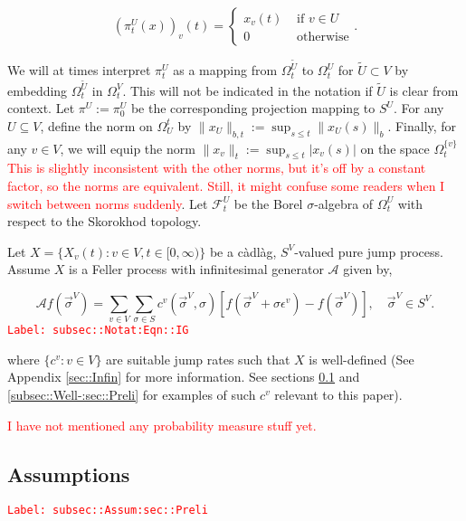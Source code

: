 \documentclass[12pt]{article}
\newcommand{\mc}{\mathcal}
\newcommand{\te}{\text}
\newcommand{\ep}{\epsilon}
\newcommand{\tr}{\textcolor{red}}
\newcommand{\labe}[1]{\tr{\texttt{Label: #1}}}
\newcommand{\ind}{\hspace{24pt}}
\newcommand{\defeq}{:=}								%
\renewcommand{\v}{v}							%
\renewcommand{\U}{U}							%
\renewcommand{\S}{S}							%
\newcommand{\s}{\sigma}							%
\newcommand{\sv}{\vec{\s}}						%
\renewcommand{\b}{b}							%
\newcommand{\ev}{\ep}							%
\newcommand{\x}{x}								%
\renewcommand{\t}{t}							%
\newcommand{\sset}{\Omega}						%
\newcommand{\proj}{\pi}							%
\renewcommand{\tt}{s}							%
\newcommand{\F}{\mc{F}}							%
\newcommand{\X}{X}								%
\newcommand{\IG}{\mc{A}}						%
\newcommand{\IGr}{c}							%
\newcommand{\vind}[1]{^{#1}}					%
\newcommand{\carp}[1]{^{#1}}					%
\newcommand{\vsi}[1]{^{#1}}						%
\newcommand{\cind}[1]{_{#1}}					%
\newcommand{\tp}[1]{(#1)}						%
\newcommand{\ts}[1]{_{#1}}						%
\newcommand{\alt}[1]{\widetilde{#1}}			%
\begin{document}
\[\left(\proj\vsi{\U}\ts{\t}(\x)\right)\cind{\v}\tp{\t} = \begin{cases}
\x\cind{\v}\tp{\t} &\te{ if } \v \in \U\\
0 &\te{ otherwise}
\end{cases}.\]

We will at times interpret \(\proj\vsi{\U}\ts{\t}\) as a mapping from \(\sset\vsi{\alt{\U}}\ts{\t}\) to \(\sset\vsi{\U}\ts{\t}\) for \(\alt{\U}\subset V\) by embedding \(\sset\vsi{\alt{U}}\ts{\t}\) in \(\sset\vsi{V}\ts{\t}\). This will not be indicated in the notation if \(\alt{\U}\) is clear from context. Let \(\proj\vsi{\U} \defeq \proj\vsi{\U}\ts{0}\) be the corresponding projection mapping to \(\S\carp{\U}\). For any \(\U\subseteq V\), define the norm on \(\sset\vsi{\t}\ts{\U}\) by \(\|\x\cind{\U}\|_{\b,\t} \defeq \sup_{\tt \leq \t} \|\x\cind{\U}\tp{\tt}\|_{\b}\). Finally, for any \(\v\in V\), we will equip the norm \(\|\x\cind{\v}\|_\t \defeq \sup_{\tt\leq \t} |x\cind{\v}\tp{\tt}|\) on the space \(\sset\vsi{\{\v\}}\ts{\t}\) \tr{This is slightly inconsistent with the other norms, but it's off by a constant factor, so the norms are equivalent. Still, it might confuse some readers when I switch between norms suddenly}. Let \(\F\vsi{\U}\ts{\t}\) be the Borel \(\sigma\)-algebra of \(\sset\vsi{\U}\ts{\t}\) with respect to the Skorokhod topology. 

\ind Let \(\X = \{\X\cind{\v}\tp{\t}:\v\in V,\t\in [0,\infty)\}\) be a c\`adl\`ag, \(\S\carp{V}\)-valued pure jump process. Assume \(\X\) is a Feller process with infinitesimal generator \(\IG\) given by,

\begin{equation}
\IG f(\sv\vsi{V}) = \sum_{\v \in V}\sum_{\s \in \S} \IGr\vind{\v}(\sv\vsi{V},\s)[f(\sv\vsi{V} + \s \ev\vind{\v}) - f(\sv\vsi{V})], \quad \sv\vsi{V} \in \S\carp{V}.
\label{subsec::Notat:Eqn::IG}
\end{equation}
\labe{subsec::Notat:Eqn::IG}

where \(\{\IGr\vind{\v}:\v\in V\}\) are suitable jump rates such that \(\X\) is well-defined (See Appendix \ref{sec::Infin} for more information. See sections \ref{subsec::Assum:sec::Preli} and \ref{subsec::Well-:sec::Preli} for examples of such \(\IGr\vind{\v}\) relevant to this paper). 

\tr{I have not mentioned any probability measure stuff yet.}

\subsection{Assumptions}
\label{subsec::Assum:sec::Preli}\labe{subsec::Assum:sec::Preli}
\end{document}

